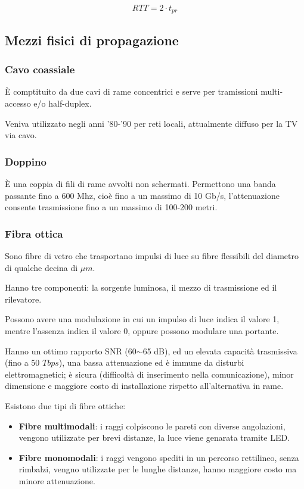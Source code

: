             \begin{equation*}
                RTT = 2 \cdot t_{pr}
            \end{equation*}

    \subsection{Mezzi fisici di propagazione}
        \subsubsection{Cavo coassiale}
            È comptituito da due cavi di rame concentrici e serve per tramissioni multi-accesso e/o half-duplex.

            Veniva utilizzato negli anni '80-'90 per reti locali, attualmente diffuso per la TV via cavo.

        \subsubsection{Doppino}
            È una coppia di fili di rame avvolti non schermati. Permettono una banda passante fino a 600 Mhz, cioè fino a un massimo di 10 Gb/s, l'attenuazione consente trasmissione fino a un massimo di 100-200 metri.

        \subsubsection{Fibra ottica}
            Sono fibre di vetro che trasportano impulsi di luce su fibre flessibili del diametro di qualche decina di $\mu m$.
        
            Hanno tre componenti: la sorgente luminosa, il mezzo di trasmissione ed il rilevatore.
        
            Possono avere una modulazione in cui un impulso di luce indica il valore 1, mentre l'assenza indica il valore 0, oppure possono modulare una portante.

            Hanno un ottimo rapporto SNR (60$\sim$65 dB), ed un elevata capacità trasmissiva (fino a 50 $Tbps$), una bassa attenuazione ed è immune da disturbi elettromagnetici; è sicura (difficoltà di inserimento nella comunicazione), minor dimensione e maggiore costo di installazione rispetto all'alternativa in rame.

            Esistono due tipi di fibre ottiche:
            \begin{itemize}
                \item \textbf{Fibre multimodali}: i raggi colpiscono le pareti con diverse angolazioni, vengono utilizzate per brevi distanze, la luce viene genarata tramite LED.
                \item \textbf{Fibre monomodali}: i raggi vengono spediti in un percorso rettilineo, senza rimbalzi, vengno utilizzate per le lunghe distanze, hanno maggiore costo ma minore attenuazione.
            \end{itemize}

